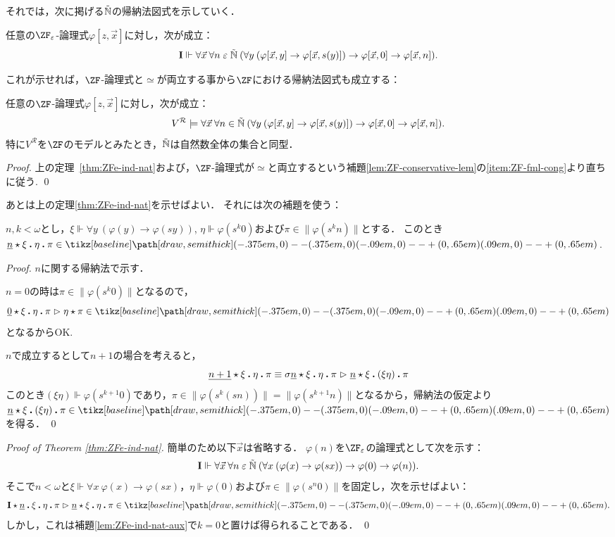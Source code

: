 \documentclass[realisability.tex]{subfiles}
\begin{document}
それでは，次に掲げる$\mathord{\tilde{\mathbb{N}}}$の帰納法図式を示していく．
\begin{theorem} \label{thm:ZFe-ind-nat}
 任意の$\ZF_{\varepsilon}$-論理式$\varphi[z, \vec{x}]$に対し，次が成立：
 \[
  \mathsf{\mathbf{I}} \Vdash \forall \vec{x}\: \forall n \mathrel{\varepsilon} \mathord{\tilde{\mathbb{N}}} \:(\forall y\: (\varphi[\vec{x}, y] \to \varphi[\vec{x}, s(y)]) \to \varphi[\vec{x}, 0] \to \varphi[\vec{x}, n]).
 \]
\end{theorem}
これが示せれば，$\ZF$-論理式と$\simeq$が両立する事から$\ZF$における帰納法図式も成立する：
\begin{corollary}\label{cor:ZF-ind-nat}
 任意の$\ZF$-論理式$\varphi[z, \vec{x}]$に対し，次が成立：
 \[
  V^{\mathcal{R}} \models \forall \vec{x}\: \forall n \in \mathord{\tilde{\mathbb{N}}} \:(\forall y\: (\varphi[\vec{x}, y] \to \varphi[\vec{x}, s(y)]) \to \varphi[\vec{x}, 0] \to \varphi[\vec{x}, n]).
 \]
 特に$V^{\mathcal{R}}$を$\ZF$のモデルとみたとき，$\mathord{\tilde{\mathbb{N}}}$は自然数全体の集合と同型．
\end{corollary}
\begin{proof}
 上の定理~\ref{thm:ZFe-ind-nat}および，$\ZF$-論理式が$\simeq$と両立するという補題\ref{lem:ZF-conservative-lem}の\ref{item:ZF-fml-cong}より直ちに従う. \qed
\end{proof}
あとは上の定理\ref{thm:ZFe-ind-nat}を示せばよい．
それには次の補題を使う：
\begin{lemma}\label{lem:ZFe-ind-nat-aux}
 $n, k < \omega$とし，$\xi \Vdash \forall y\: (\varphi(y) \to \varphi(s y))$, $\eta \Vdash \varphi(s^k 0)$および$\pi \in \|\varphi(s^k n)\|$とする．
 このとき$\KVM{{{\num n}} \xi \eta \pi} \in \pole$.
\end{lemma}
\begin{proof}
 $n$に関する帰納法で示す．

 $n = 0$の時は$\pi \in \|\varphi(s^k 0)\|$となるので，
 \[
  \KVM{{{\num 0}} \xi \eta \pi} \redsto \KVM{\eta \pi} \in \pole
 \]
 となるからOK.

 $n$で成立するとして$n + 1$の場合を考えると，
 \[
  \KVM{{{\num{n+1}}} \xi \eta \pi} \equiv
  \KVM{{\sigma \num{n}} \xi \eta \pi} \redsto
  \KVM{{{\num{n}}} \xi {(\xi \eta)} \pi}
 \]
 このとき$(\xi\eta) \Vdash \varphi(s^{k+1} 0)$であり，$\pi \in \|\varphi(s^k(s n))\| = \|\varphi(s^{k+1} n)\|$となるから，帰納法の仮定より$\KVM{{{\num{n}}} \xi {(\xi \eta)} \pi} \in \pole$を得る． \qed
\end{proof}

\begin{proof}[Proof of Theorem \ref{thm:ZFe-ind-nat}]
 簡単のため以下$\vec{x}$は省略する．
 $\varphi(n)$を$\ZF_{\varepsilon}$の論理式として次を示す：
  \[
  \mathsf{\mathbf{I}} \Vdash \forall \vec{x}\: \forall n \mathrel{\varepsilon} \mathord{\tilde{\mathbb{N}}} \:(\forall x\: (\varphi(x) \to \varphi(sx)) \to \varphi(0) \to \varphi(n)).
 \]
 そこで$n < \omega$と$\xi \Vdash \forall x \: \varphi(x) \to \varphi(s x)$，$\eta \Vdash \varphi(0)$および$\pi \in \|\varphi(s^n 0)\|$を固定し，次を示せばよい：
 \[
  \KVM{{\I}{{\num{n}}} \xi\eta {\pi}} \redsto
  \KVM{{{\num{n}}} \xi \eta \pi} \in \pole.
 \]
 しかし，これは補題\ref{lem:ZFe-ind-nat-aux}で$k = 0$と置けば得られることである． \qed
\end{proof}
\end{document}
